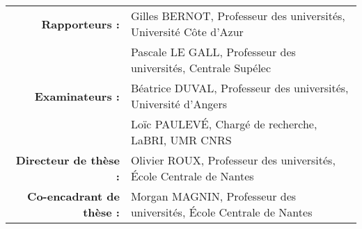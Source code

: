 \begin{tabular}{r@{\ \ }l}
\textbf{Rapporteurs :}
& Gilles BERNOT, Professeur des universités,
    Université Côte d'Azur \\
& Pascale LE GALL, Professeur des universités,
    Centrale Supélec \vspace*{1em} \\
\textbf{Examinateurs :}
& Béatrice DUVAL, Professeur des universités, Université d'Angers  \\
& Loïc PAULEVÉ, Chargé de recherche,
    LaBRI, UMR CNRS \vspace*{1em} \\
\textbf{Directeur de thèse :}
& Olivier ROUX, Professeur des universités,
    École Centrale de Nantes \\
\textbf{Co-encadrant de thèse :}
& Morgan MAGNIN, Professeur des universités,
    École Centrale de Nantes
\end{tabular}